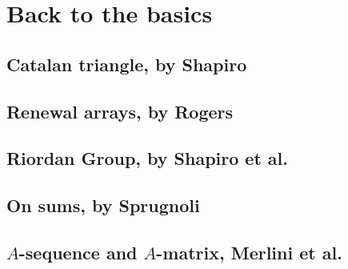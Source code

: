 
\chapter{Back to the basics}

\section{Catalan triangle, by Shapiro}
\section{Renewal arrays, by Rogers}

\section{Riordan Group, by Shapiro et al.}
\section{On sums, by Sprugnoli}
\section{$A$-sequence and $A$-matrix, Merlini et al.}
